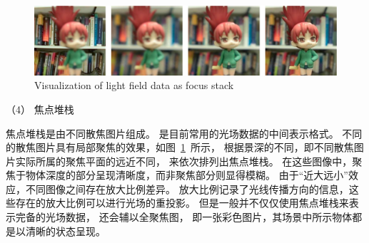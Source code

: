 




\begin{figure}[!ht]
	\centering
	\includegraphics[width=0.95\linewidth]{figures/chapter2/focal_stack}
	{Visualization of light field data as focus stack}  
	\label{cpt2_fig7:focal_stack}
\end{figure}






（4）
焦点堆栈






焦点堆栈是由不同散焦图片组成。
是目前常用的光场数据的中间表示格式。
不同的散焦图片具有局部聚焦的效果，如图~\ref{cpt2_fig7:focal_stack}~所示，
根据景深的不同，即不同散焦图片实际所属的聚焦平面的远近不同，
来依次排列出焦点堆栈。
在这些图像中，聚焦于物体深度的部分呈现清晰度，而非聚焦部分则显得模糊。
由于“近大远小”效应，不同图像之间存在放大比例差异。
放大比例记录了光线传播方向的信息，这些存在的放大比例可以进行光场的重投影。
但是一般并不仅仅使用焦点堆栈来表示完备的光场数据，
还会辅以全聚焦图，
即一张彩色图片，其场景中所示物体都是以清晰的状态呈现。







